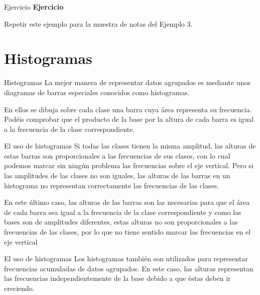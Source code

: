 \documentclass[
  ignorenonframetext,
]{beamer}
\begin{document}
\begin{frame}{Ejercicio}
\protect\hypertarget{ejercicio-1}{}
\textbf{Ejercicio}

Repetir este ejemplo para la muestra de notas del Ejemplo 3.
\end{frame}

\hypertarget{histogramas}{%
\section{Histogramas}\label{histogramas}}

\begin{frame}{Histogramas}
\protect\hypertarget{histogramas-1}{}
La mejor manera de representar datos agrupados es mediante unos
diagramas de barras especiales conocidos como histogramas.

En ellos se dibuja sobre cada clase una barra cuya área representa su
frecuencia. Podéis comprobar que el producto de la base por la altura de
cada barra es igual a la frecuencia de la clase correspondiente.
\end{frame}

\begin{frame}{El uso de histogramas}
\protect\hypertarget{el-uso-de-histogramas}{}
Si todas las clases tienen la misma amplitud, las alturas de estas
barras son proporcionales a las frecuencias de sus clases, con lo cual
podemos marcar sin ningún problema las frecuencias sobre el eje
vertical. Pero si las amplitudes de las clases no son iguales, las
alturas de las barras en un histograma no representan correctamente las
frecuencias de las clases.

En este último caso, las alturas de las barras son las necesarias para
que el área de cada barra sea igual a la frecuencia de la clase
correspondiente y como las bases son de amplitudes diferentes, estas
alturas no son proporcionales a las frecuencias de las clases, por lo
que no tiene sentido marcar las frecuencias en el eje vertical
\end{frame}

\begin{frame}{El uso de histogramas}
\protect\hypertarget{el-uso-de-histogramas-1}{}
Los histogramas también son utilizados para representar frecuencias
acumuladas de datos agrupados. En este caso, las alturas representan las
frecuencias independientemente de la base debido a que éstas deben ir
creciendo.
\end{frame}
\end{document}
